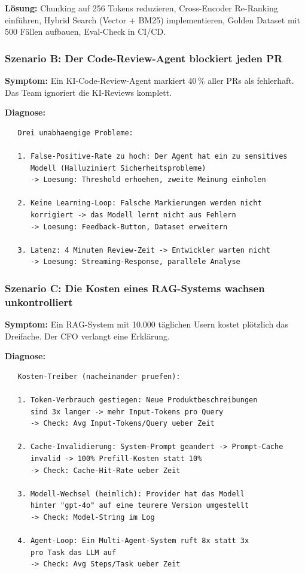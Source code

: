 \textbf{Lösung:} Chunking auf 256 Tokens reduzieren, Cross-Encoder Re-Ranking einführen, Hybrid Search (Vector + BM25) implementieren, Golden Dataset mit 500 Fällen aufbauen, Eval-Check in CI/CD.

\subsubsection{Szenario B: Der Code-Review-Agent blockiert jeden PR}

\textbf{Symptom:} Ein KI-Code-Review-Agent markiert 40\,\% aller PRs als fehlerhaft. Das Team ignoriert die KI-Reviews komplett.

\textbf{Diagnose:}

\begin{verbatim}
   Drei unabhaengige Probleme:

   1. False-Positive-Rate zu hoch: Der Agent hat ein zu sensitives
      Modell (Halluziniert Sicherheitsprobleme)
      -> Loesung: Threshold erhoehen, zweite Meinung einholen

   2. Keine Learning-Loop: Falsche Markierungen werden nicht
      korrigiert -> das Modell lernt nicht aus Fehlern
      -> Loesung: Feedback-Button, Dataset erweitern

   3. Latenz: 4 Minuten Review-Zeit -> Entwickler warten nicht
      -> Loesung: Streaming-Response, parallele Analyse
\end{verbatim}

\subsubsection{Szenario C: Die Kosten eines RAG-Systems wachsen unkontrolliert}

\textbf{Symptom:} Ein RAG-System mit 10.000 täglichen Usern kostet plötzlich das Dreifache. Der CFO verlangt eine Erklärung.

\textbf{Diagnose:}

\begin{verbatim}
   Kosten-Treiber (nacheinander pruefen):

   1. Token-Verbrauch gestiegen: Neue Produktbeschreibungen
      sind 3x langer -> mehr Input-Tokens pro Query
      -> Check: Avg Input-Tokens/Query ueber Zeit

   2. Cache-Invalidierung: System-Prompt geandert -> Prompt-Cache
      invalid -> 100% Prefill-Kosten statt 10%
      -> Check: Cache-Hit-Rate ueber Zeit

   3. Modell-Wechsel (heimlich): Provider hat das Modell
      hinter "gpt-4o" auf eine teurere Version umgestellt
      -> Check: Model-String im Log

   4. Agent-Loop: Ein Multi-Agent-System ruft 8x statt 3x
      pro Task das LLM auf
      -> Check: Avg Steps/Task ueber Zeit
\end{verbatim}

